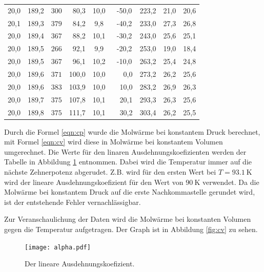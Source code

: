 \begin{table}
\begin{tabular}{S[table-format=2.1] S S S[table-format=2.1] S S S S S}
          {20,0 } & {189,2}  & {$300$} & {~80,3} & 10,0 & {~-50,0} & 223,2 & {21,0} & {20,6} \\
          {20,1 } & {189,3}  & {$379$} & {~84,2} &  9,8 & {~-40,2} & 233,0 & {27,3} & {26,8} \\
          {20,0 } & {189,4}  & {$367$} & {~88,2} & 10,1 & {~-30,2} & 243,0 & {25,6} & {25,1} \\
          {20,0 } & {189,5}  & {$266$} & {~92,1} &  9,9 & {~-20,2} & 253,0 & {19,0} & {18,4} \\
          {20,0 } & {189,5}  & {$367$} & {~96,1} & 10,2 & {~-10,0} & 263,2 & {25,4} & {24,8} \\
          {20,0 } & {189,6}  & {$371$} & {100,0} & 10,0 & {~~~0,0} & 273,2 & {26,2} & {25,6} \\
          {20,0 } & {189,6}  & {$383$} & {103,9} & 10,0 & {~~10,0} & 283,2 & {26,9} & {26,3} \\
          {20,0 } & {189,7}  & {$375$} & {107,8} & 10,1 & {~~20,1} & 293,3 & {26,3} & {25,6} \\
          {20,0 } & {189,8}  & {$375$} & {111,7} & 10,1 & {~~30,2} & 303,4 & {26,2} & {25,5} \\
      \bottomrule
    \end{tabular}
\end{table}
\FloatBarrier

Durch die Formel \ref{eqn:cp} wurde die Molwärme bei konstantem Druck berechnet, mit Formel \ref{eqn:cv} 
wird diese in Molwärme bei konstantem Volumen umgerechnet. Die Werte für den linaren Ausdehnungskoefizienten 
werden der Tabelle in Abbildung \ref{fig:a} entnommen. Dabei wird die Temperatur immer auf die nächste 
Zehnerpotenz abgerudet. Z.B. wird für den ersten Wert bei $T=\SI{93,1}{\kelvin}$ wird der lineare Ausdehnungskoefizient 
für den Wert von $\SI{90}{\kelvin}$ verwendet. Da die Molwärme bei konstantem Druck auf die erste Nachkommastelle 
gerundet wird, ist der entstehende Fehler vernachlässigbar.

Zur Veranschaulichung der Daten wird die Molwärme bei konstanten Volumen gegen die Temperatur aufgetragen. 
Der Graph ist in Abbildung \ref{fig:cv} zu sehen. 

\begin{figure}
  \centering
  \texttt{[image: alpha.pdf]}
  \caption{Der lineare Ausdehnungskoefizient.}
  \label{fig:a}
\end{figure}

